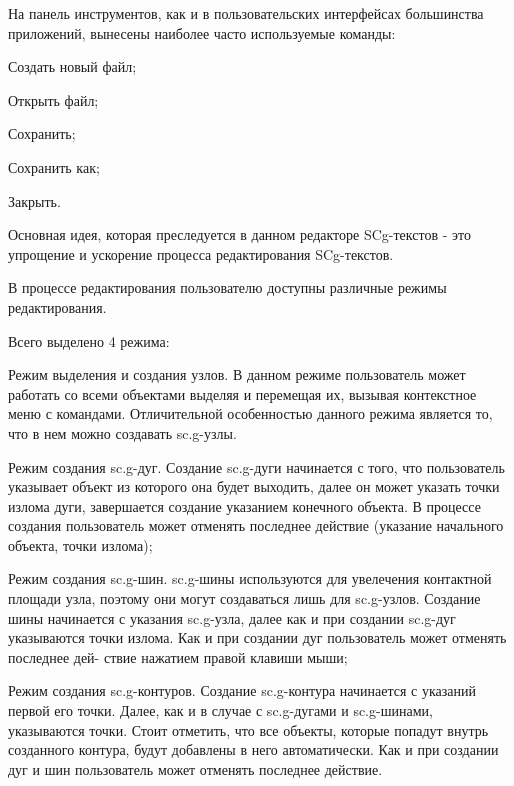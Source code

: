 На панель инструментов, как и в пользовательских интерфейсах большинства приложений, вынесены наиболее часто используемые команды:
\begin{textitemize}
\item Создать новый файл;
\item Открыть файл;
\item Сохранить;
\item Сохранить как;
\item Закрыть.
\end{textitemize}

Основная идея, которая преследуется в данном редакторе SCg-текстов - это упрощение и ускорение процесса редактирования SCg-текстов.

В процессе редактирования пользователю доступны различные режимы редактирования.

Всего выделено 4 режима:
\begin{textitemize}
\item Режим выделения и создания узлов.
В данном режиме пользователь может работать со всеми объектами выделяя и перемещая их, вызывая контекстное меню с командами.
Отличительной особенностью данного режима является то, что в нем можно создавать sc.g-узлы.

\item Режим создания sc.g-дуг.
Создание sc.g-дуги начинается с того, что пользователь указывает объект из которого она будет выходить, далее он может указать точки излома дуги, завершается создание указанием конечного объекта.
В процессе создания пользователь может отменять последнее действие (указание начального объекта, точки излома);

\item Режим создания sc.g-шин.
sc.g-шины используются для увелечения контактной площади узла, поэтому они могут создаваться лишь для sc.g-узлов. 
Создание шины начинается с указания sc.g-узла, далее как и при создании sc.g-дуг указываются точки излома. 
Как и при создании дуг пользователь может отменять последнее дей-
ствие нажатием правой клавиши мыши;

\item Режим создания sc.g-контуров.
Создание sc.g-контура начинается с указаний первой его точки. Далее, как и в случае с sc.g-дугами и sc.g-шинами, указываются точки.
Стоит отметить, что все объекты, которые попадут внутрь созданного
контура, будут добавлены в него автоматически.
Как и при создании дуг и шин пользователь может отменять последнее действие.
\end{textitemize}

